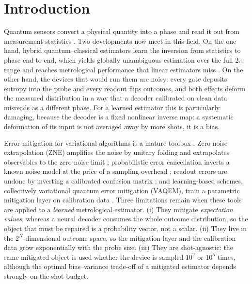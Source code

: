 \documentclass[ASNA,twocolumn]{USG}
\begin{document}
\maketitle

\section{Introduction}
\label{sec:intro}

Quantum sensors convert a physical quantity into a phase and read it out from
measurement statistics \cite{degen2017quantum,pezze2018quantum}.  Two
developments now meet in this field.  On the one hand, hybrid
quantum--classical estimators learn the inversion from statistics to phase
end-to-end, which yields globally unambiguous estimation over the full $2\pi$
range \cite{fiderer2021neural,gebhart2023learning,yang2025vqcnni} and reaches
metrological performance that linear estimators miss
\cite{marciniak2022optimal,kaubruegger2021quantum}.  On the other hand, the
devices that would run them are noisy: every gate deposits entropy into the
probe and every readout flips outcomes, and both effects deform the measured
distribution in a way that a decoder calibrated on clean data misreads as a
different phase.  For a learned estimator this is particularly damaging,
because the decoder is a fixed nonlinear inverse map: a systematic deformation
of its input is not averaged away by more shots, it is a bias.

Error mitigation for variational algorithms is a mature toolbox
\cite{cai2023quantum,bharti2022noisy}.  Zero-noise extrapolation (ZNE)
amplifies the noise by unitary folding and extrapolates observables to the
zero-noise limit \cite{li2017efficient,temme2017error,endo2018practical,
giurgica2020digital}; probabilistic error cancellation inverts a known noise
model at the price of a sampling overhead \cite{temme2017error,endo2018practical};
readout errors are undone by inverting a calibrated confusion matrix
\cite{maciejewski2020mitigation,bravyi2021mitigating}; and learning-based
schemes, collectively variational quantum error mitigation (VAQEM), train a
parametric mitigation layer on calibration data
\cite{strikis2021learning,czarnik2021qubit,czarnik2021error,lowe2021unified}.
Three limitations remain when these tools are applied to a \emph{learned}
metrological estimator.  (i) They mitigate \emph{expectation values}, whereas a
neural decoder consumes the whole outcome distribution, so the object that must
be repaired is a probability vector, not a scalar.  (ii) They live in the
$2^N$-dimensional outcome space, so the mitigation layer and the calibration
data grow exponentially with the probe size.  (iii) They are shot-agnostic: the
same mitigated object is used whether the device is sampled $10^2$ or $10^5$
times, although the optimal bias--variance trade-off of a mitigated estimator
depends strongly on the shot budget.
\end{document}
